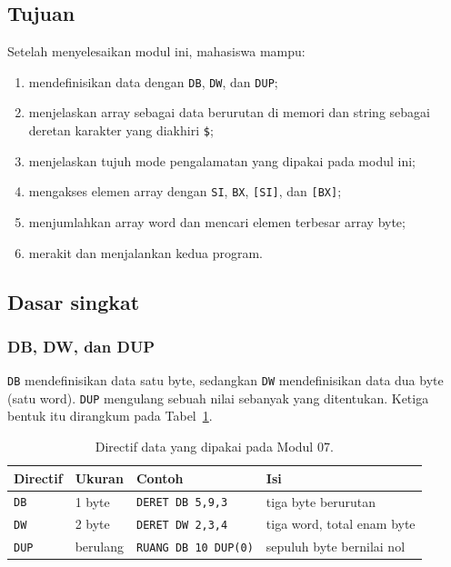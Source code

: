 
\subsection{Tujuan}

\begin{tujuan}
Setelah menyelesaikan modul ini, mahasiswa mampu:
\begin{enumerate}
    \item mendefinisikan data dengan \texttt{DB}, \texttt{DW}, dan
          \texttt{DUP};
    \item menjelaskan array sebagai data berurutan di memori dan
          string sebagai deretan karakter yang diakhiri \texttt{\$};
    \item menjelaskan tujuh mode pengalamatan yang dipakai pada modul
          ini;
    \item mengakses elemen array dengan \texttt{SI}, \texttt{BX},
          \texttt{[SI]}, dan \texttt{[BX]};
    \item menjumlahkan array word dan mencari elemen terbesar array
          byte;
    \item merakit dan menjalankan kedua program.
\end{enumerate}
\end{tujuan}

\subsection{Dasar singkat}

\subsubsection*{DB, DW, dan DUP}

\texttt{DB} mendefinisikan data satu byte, sedangkan \texttt{DW}
mendefinisikan data dua byte (satu word). \texttt{DUP} mengulang
sebuah nilai sebanyak yang ditentukan. Ketiga bentuk itu dirangkum
pada Tabel~\ref{tab:m07-data}.

\begin{table}[H]
    \centering
    \caption{Directif data yang dipakai pada Modul 07.}
    \label{tab:m07-data}
    \small
    \begin{tabular}{@{}llll@{}}
        \toprule
        \textbf{Directif} & \textbf{Ukuran} & \textbf{Contoh} &
        \textbf{Isi} \\
        \midrule
        \texttt{DB} & 1 byte & \texttt{DERET DB 5,9,3} &
        tiga byte berurutan \\
        \texttt{DW} & 2 byte & \texttt{DERET DW 2,3,4} &
        tiga word, total enam byte \\
        \texttt{DUP} & berulang & \texttt{RUANG DB 10 DUP(0)} &
        sepuluh byte bernilai nol \\
        \bottomrule
    \end{tabular}
\end{table}

